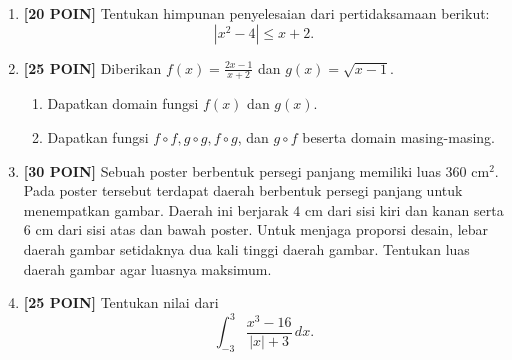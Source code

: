 \documentclass[11pt,openany,a4paper]{article}
\begin{document}
\begin{enumerate}
  \item \textbf{[20 POIN]} Tentukan himpunan penyelesaian dari pertidaksamaan berikut:
        \[
          |x^2 - 4| \le x + 2.
        \]

  \item \textbf{[25 POIN]} Diberikan \( f(x) = \frac{2x-1}{x+2} \) dan \( g(x) = \sqrt{x - 1} \).
        \begin{enumerate}
          \item Dapatkan domain fungsi \( f(x) \) dan \( g(x) \).
          \item Dapatkan fungsi \( f \circ f, g \circ g, f \circ g \), dan \( g \circ f \) beserta domain masing-masing.
        \end{enumerate}

  \item \textbf{[30 POIN]} Sebuah poster berbentuk persegi panjang memiliki luas \( 360 \text{ cm}^2 \). Pada poster tersebut
        terdapat daerah berbentuk persegi panjang untuk menempatkan gambar. Daerah ini berjarak \( 4 \text{ cm} \)
        dari sisi kiri dan kanan serta \( 6 \text{ cm} \) dari sisi atas dan bawah poster. Untuk menjaga proporsi desain,
        lebar daerah gambar setidaknya dua kali tinggi daerah gambar. Tentukan luas daerah gambar agar
        luasnya maksimum.

        \begin{center}
        \end{center}

  \item \textbf{[25 POIN]} Tentukan nilai dari
        \[
          \int_{-3}^{3} \frac{x^3 - 16}{|x| + 3} \, dx.
        \]
\end{enumerate}
\end{document}
